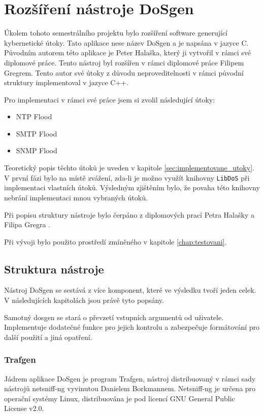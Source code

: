 \chapter{Rozšíření nástroje DoSgen}
Úkolem tohoto semestrálního projektu bylo rozšíření software generující kybernetické útoky. Tato aplikace nese název DoSgen a je napsána v jazyce C. Původním autorem této aplikace je Peter Halaška, který ji vytvořil v rámci své diplomové práce. Tento nástroj byl rozšířen v rámci diplomové práce Filipem Gregrem. Tento autor své útoky z důvodu neproveditelnosti v rámci původní struktury implementoval v jazyce C++.

Pro implementaci v rámci své práce jsem si zvolil následující útoky:
\begin{itemize}
	\item{NTP Flood}
	\item{SMTP Flood} %
	\item{SNMP Flood}
\end{itemize}

Teoretický popis těchto útoků je uveden v kapitole \ref{sec:implementovane_utoky}. V první fázi bylo na místě zvážení, zda-li je možno využít knihovny \texttt{LibDoS} při implementaci vlastních útoků. Výsledným zjištěním bylo, že povaha této knihovny nebrání implementaci mnou vybraných útoků.

Při popisu struktury nástroje bylo čerpáno z diplomových prací Petra Halašky \cite{Halaska2016} a Filipa Gregra \cite{Gregr2017}.

Při vývoji bylo použito prostředí zmíněného v kapitole \ref{chap:testovani}.

\section{Struktura nástroje}
Nástroj DoSgen se sestává z více komponent, které ve výsledku tvoří jeden celek. V následujících kapitolách jsou právě tyto popsány.

Samotný dosgen se stará o převzetí vstupních argumentů od uživatele. Implementuje dodatečné funkce pro jejich kontrolu a zabezpečuje formátování pro další použití a jiná opatření.

\subsection{Trafgen}
Jádrem aplikace DoSgen je program Trafgen, nástroj distribuovaný v rámci sady nástrojů netsniff-ng vyvinutou Danielem Borkmannem. Netsniff-ng je určena pro operační systémy Linux, distribuována je pod licencí GNU General Public License v2.0.

